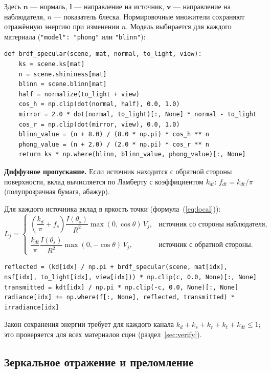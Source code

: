 \documentclass[12pt,a4paper]{article}
\newcommand{\vect}[1]{\mathbf{#1}}
\begin{document}
Здесь $\vect n$ — нормаль, $\vect l$ — направление на источник, $\vect v$ — направление на наблюдателя,
$n$ — показатель блеска. Нормировочные множители сохраняют отражённую энергию при изменении $n$.
Модель выбирается для каждого материала (\texttt{"model": "phong"} или \texttt{"blinn"}):

\begin{lstlisting}
def brdf_specular(scene, mat, normal, to_light, view):
    ks = scene.ks[mat]
    n = scene.shininess[mat]
    blinn = scene.blinn[mat]
    half = normalize(to_light + view)
    cos_h = np.clip(dot(normal, half), 0.0, 1.0)
    mirror = 2.0 * dot(normal, to_light)[:, None] * normal - to_light
    cos_r = np.clip(dot(mirror, view), 0.0, 1.0)
    blinn_value = (n + 8.0) / (8.0 * np.pi) * cos_h ** n
    phong_value = (n + 2.0) / (2.0 * np.pi) * cos_r ** n
    return ks * np.where(blinn, blinn_value, phong_value)[:, None]
\end{lstlisting}

\textbf{Диффузное пропускание.} Если источник находится с обратной стороны поверхности, вклад вычисляется по
Ламберту с коэффициентом $k_{dt}$: $f_{dt} = k_{dt}/\pi$ (полупрозрачная бумага, абажур).

Для каждого источника вклад в яркость точки (формула~(\ref{eq:local})):
\begin{equation}
L_j = \begin{cases}
\left(\dfrac{k_d}{\pi} + f_s\right)\dfrac{I(\theta_s)}{R^2}\max(0,\cos\theta)\,V_j, & \text{источник со стороны наблюдателя},\\[3mm]
\dfrac{k_{dt}}{\pi}\dfrac{I(\theta_s)}{R^2}\max(0,-\cos\theta)\,V_j, & \text{источник с обратной стороны}.
\end{cases}
\end{equation}

\begin{lstlisting}
reflected = (kd[idx] / np.pi + brdf_specular(scene, mat[idx], nsf[idx], to_light[idx], view[idx])) * np.clip(c, 0.0, None)[:, None]
transmitted = kdt[idx] / np.pi * np.clip(-c, 0.0, None)[:, None]
radiance[idx] += np.where(f[:, None], reflected, transmitted) * irradiance[idx]
\end{lstlisting}

Закон сохранения энергии требует для каждого канала $k_d + k_s + k_r + k_t + k_{dt} \le 1$; это проверяется
для всех материалов сцен (раздел~\ref{sec:verify}).

\subsection{Зеркальное отражение и преломление}
\end{document}
